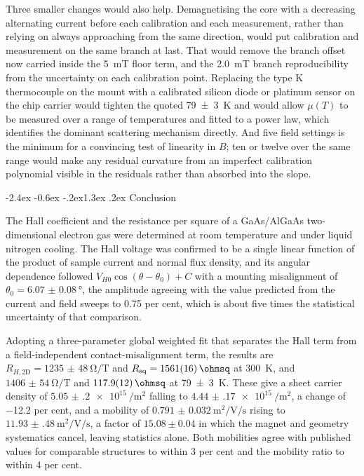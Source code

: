 \documentclass[11pt,a4paper]{article}
\makeatletter
\renewcommand\section{\@startsection{section}{1}{\z@}%
  {-2.4ex \@plus -0.6ex \@minus -.2ex}{1.3ex \@plus .2ex}%
  {\normalfont\large\bfseries}}
\newcommand{\Rsq}{R_{\mathrm{sq}}}
\newcommand{\Rhtwod}{R_{H,\mathrm{2D}}}
\makeatother
\begin{document}
Three smaller changes would also help. Demagnetising the core with a decreasing alternating
current before each calibration and each measurement, rather than relying on always
approaching from the same direction, would put calibration and measurement on the same
branch at last. That would remove the branch offset now carried inside the
\qty{5}{\milli\tesla} floor term, and the \qty{2.0}{\milli\tesla} branch reproducibility from
the uncertainty on each calibration point. Replacing the type K thermocouple on the mount with a calibrated silicon
diode or platinum sensor on the chip carrier would tighten the quoted \qty{79(3)}{\kelvin}
and would allow $\mu(T)$ to be measured over a range of temperatures and fitted to a power
law, which identifies the dominant scattering mechanism directly. And five field settings is
the minimum for a convincing test of linearity in $B$; ten or twelve over the same range
would make any residual curvature from an imperfect calibration polynomial visible in the
residuals rather than absorbed into the slope.

\section{Conclusion}

The Hall coefficient and the resistance per square of a GaAs/AlGaAs two-dimensional electron
gas were determined at room temperature and under liquid nitrogen cooling. The Hall voltage
was confirmed to be a single linear function of the product of sample current and normal flux
density, and its angular dependence followed $V_{H0}\cos(\theta-\theta_0)+C$ with a mounting
misalignment of $\theta_0 = \qty{6.07(8)}{\degree}$, the amplitude agreeing with the value
predicted from the current and field sweeps to \num{0.75} per cent, which is about five times
the statistical uncertainty of that comparison.

Adopting a three-parameter global weighted fit that separates the Hall term from a
field-independent contact-misalignment term, the results are
$\Rhtwod = \qty{1235(48)}{\ohm\per\tesla}$ and $\Rsq = \qty{1561(16)}{\ohmsq}$ at
\qty{300}{\kelvin}, and $\qty{1406(54)}{\ohm\per\tesla}$ and $\qty{117.9(12)}{\ohmsq}$ at
\qty{79(3)}{\kelvin}. These give a sheet carrier density of
$\qty{5.05(20)e15}{\per\metre\squared}$ falling to
$\qty{4.44(17)e15}{\per\metre\squared}$, a change of \num{-12.2} per cent, and a mobility of
$\qty{0.791(32)}{\metre\squared\per\volt\per\second}$ rising to
$\qty{11.93(48)}{\metre\squared\per\volt\per\second}$, a factor of $15.08 \pm 0.04$ in which
the magnet and geometry systematics cancel, leaving statistics alone. Both
mobilities agree with published values for comparable structures to within \num{3} per cent
and the mobility ratio to within \num{4} per cent.
\end{document}
